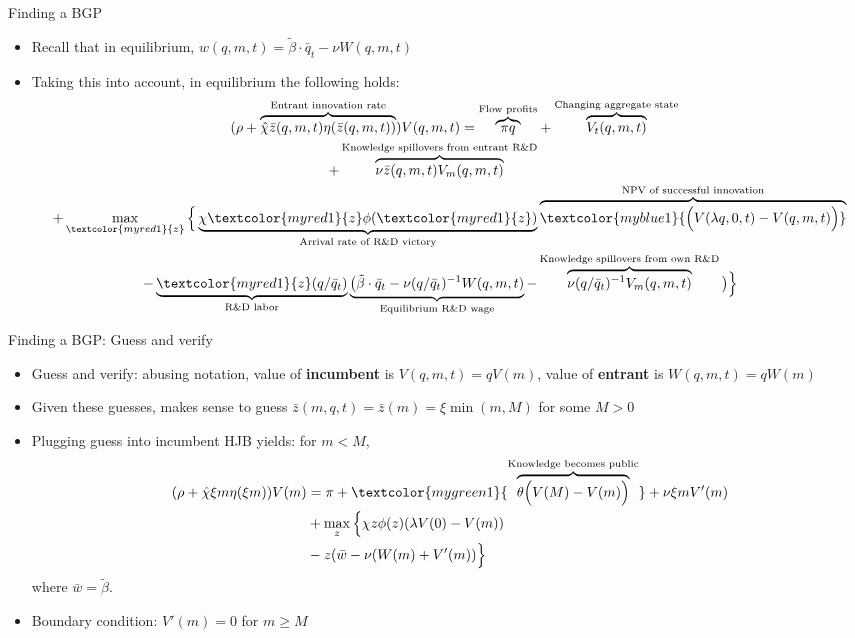 \documentclass[english,usenames,dvipsnames]{beamer}
\begin{document}
\begin{frame}{Finding a BGP}
\begin{itemize}
	\item Recall that in equilibrium, $w(q,m,t) = \tilde{\beta}\cdot\bar{q}_t - \nu W(q,m,t)$
	\item Taking this into account, in equilibrium the following holds: 
	\footnotesize
	\begin{align*}
	(\rho + \overbrace{\hat{\chi} \bar{z}(q,m,t)\eta(\bar{z}(q,m,t))}^{\text{Entrant innovation rate}}) V(q,m,t) = \overbrace{\pi q}^{\text{Flow profits}} &+ \overbrace{V_t(q,m,t)}^{\text{Changing aggregate state}} \\ 
	+  \overbrace{\nu \bar{z}(q,m,t) V_m(q,m,t)}^{\text{Knowledge spillovers from entrant R\&D}}  &\\
	+ \max_{\textcolor{myred1}{z}} \Big\{\underbrace{\chi \textcolor{myred1}{z}\phi(\textcolor{myred1}{z})}_{\text{Arrival rate of R\&D victory}} &\overbrace{\textcolor{myblue1}{\Big(V(\lambda q,0,t)-V(q,m,t)\Big)}}^{\text{NPV of successful innovation}} \\
	-\underbrace{\textcolor{myred1}{z}(q/\bar{q}_t)}_{\text{R\&D labor}} \underbrace{\big(\tilde{\beta}\cdot\bar{q}_t - \nu (q/\bar{q}_t)^{-1}W(q,m,t)}_{\text{Equilibrium R\&D wage}} - & \overbrace{\nu (q/\bar{q}_t)^{-1} V_m(q,m,t)}^{\text{Knowledge spillovers from own R\&D}}\big)\Big \} 
	\end{align*}
\end{itemize}
\end{frame}

\begin{frame}{Finding a BGP: Guess and verify}
\begin{itemize}
	\item Guess and verify: abusing notation, value of \textbf{incumbent} is $V(q,m,t) = qV(m)$, value of \textbf{entrant} is $W(q,m,t) = qW(m)$
	\item Given these guesses, makes sense to guess $\bar{z}(m,q,t) = \bar{z}(m) = \xi \min(m,M)$ for some $M > 0$
	\item Plugging guess into incumbent HJB yields: for $m < M$,
	\begin{align*}
	(\rho +  \hat{\chi}\xi m \eta(\xi m) ) V(m) &= \pi + \textcolor{mygreen1}{\overbrace{\theta \Big(V(M) - V(m) \Big)}^{\text{Knowledge becomes public}}} + \nu \xi m V'(m) \\
	&+ \max_{z} \Big\{ \chi z \phi(z) (\lambda V(0) - V(m))   \\
	&- z (\bar{w} - \nu (W(m) + V'(m)) \Big\}
	\end{align*}
	where $\bar{w} = \tilde{\beta}$. 
	\item Boundary condition: $V'(m) = 0$ for $m \ge M$
\end{itemize}
\end{frame}
\end{document}
